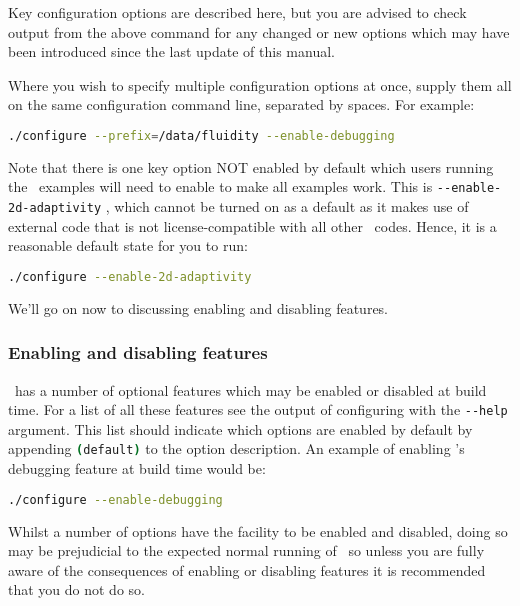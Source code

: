 Key configuration options are described here, but you are advised to check
output from the above command for any changed or new options which may have
been introduced since the last update of this manual.

Where you wish to specify multiple configuration options at once, supply them
all on the same configuration command line, separated by spaces. For example:

\begin{lstlisting}[language=Bash]
./configure --prefix=/data/fluidity --enable-debugging
\end{lstlisting}

Note that there is one key option NOT enabled by default which users running
the \fluidity\ examples will need to enable to make all examples work. This is 
\lstinline[language=Bash]+--enable-2d-adaptivity+ , which cannot be turned on
as a default as it makes use of external code that is not license-compatible
with all other \fluidity\ codes. Hence, it is a reasonable default state for
you to run:

\begin{lstlisting}[language=Bash]
./configure --enable-2d-adaptivity
\end{lstlisting}

We'll go on now to discussing enabling and disabling features.

\subsubsection{Enabling and disabling features}
\label{sec:configure_enable_disable_features}

\fluidity\ has a number of optional features which may be enabled or disabled at
build time. For a list of all these features see the output of configuring with
the \lstinline[language=Bash]+--help+ argument. This list should indicate which
options are enabled by default by appending
\lstinline[language=Bash]+(default)+ to the option description. An example of
enabling \fluidity's debugging feature at build time would be:

\begin{lstlisting}[language=Bash]
./configure --enable-debugging
\end{lstlisting}

Whilst a number of options have the facility to be enabled and disabled, doing
so may be prejudicial to the expected normal running of \fluidity\ so unless you
are fully aware of the consequences of enabling or disabling features it is
recommended that you do not do so.

